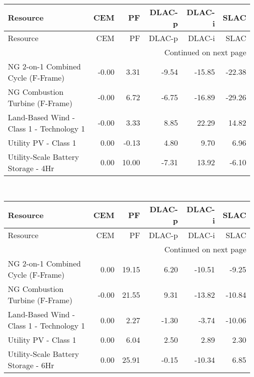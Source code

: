 \documentclass{article}
\begin{document}
\hline
{} \\
\hline
\begin{longtable}{lrrrrr}
\toprule
Resource & CEM & PF & DLAC-p & DLAC-i & SLAC \\
\midrule
\endfirsthead
\toprule
Resource & CEM & PF & DLAC-p & DLAC-i & SLAC \\
\midrule
\endhead
\midrule
\multicolumn{6}{r}{Continued on next page} \\
\midrule
\endfoot
\bottomrule
\endlastfoot
NG 2-on-1 Combined Cycle (F-Frame) & -0.00 & 3.31 & -9.54 & -15.85 & -22.38 \\
NG Combustion Turbine (F-Frame) & -0.00 & 6.72 & -6.75 & -16.89 & -29.26 \\
Land-Based Wind - Class 1 - Technology 1 & -0.00 & 3.33 & 8.85 & 22.29 & 14.82 \\
Utility PV - Class 1 & 0.00 & -0.13 & 4.80 & 9.70 & 6.96 \\
Utility-Scale Battery Storage - 4Hr & 0.00 & 10.00 & -7.31 & 13.92 & -6.10 \\
\end{longtable}


\hline
{} \\
\hline
\begin{longtable}{lrrrrr}
\toprule
Resource & CEM & PF & DLAC-p & DLAC-i & SLAC \\
\midrule
\endfirsthead
\toprule
Resource & CEM & PF & DLAC-p & DLAC-i & SLAC \\
\midrule
\endhead
\midrule
\multicolumn{6}{r}{Continued on next page} \\
\midrule
\endfoot
\bottomrule
\endlastfoot
NG 2-on-1 Combined Cycle (F-Frame) & 0.00 & 19.15 & 6.20 & -10.51 & -9.25 \\
NG Combustion Turbine (F-Frame) & -0.00 & 21.55 & 9.31 & -13.82 & -10.84 \\
Land-Based Wind - Class 1 - Technology 1 & 0.00 & 2.27 & -1.30 & -3.74 & -10.06 \\
Utility PV - Class 1 & 0.00 & 6.04 & 2.50 & 2.89 & 2.30 \\
Utility-Scale Battery Storage - 6Hr & 0.00 & 25.91 & -0.15 & -10.34 & 6.85 \\
\end{longtable}
\end{document}
